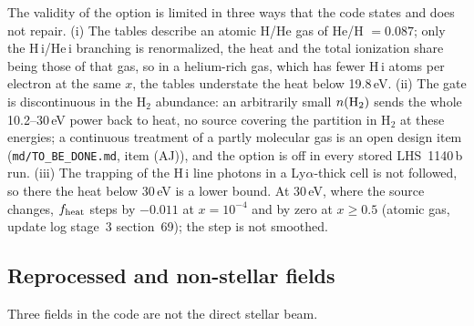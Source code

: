 The validity of the option is limited in three ways that the code states and
does not repair. (i) The tables describe an atomic H/He gas of He/H
$=0.087$; only the H\,{\sc i}/He\,{\sc i} branching is renormalized, the heat
and the total ionization share being those of that gas, so in a
helium-rich gas, which has fewer H\,{\sc i} atoms per electron at the same
$x$, the tables understate the heat below 19.8\,eV. (ii) The gate is
discontinuous in the H$_2$ abundance: an arbitrarily small $n({\rm H_2})$
sends the whole 10.2--30\,eV power back to heat, no source covering the
partition in H$_2$ at these energies; a continuous treatment of a partly
molecular gas is an open design item (\texttt{md/TO\_BE\_DONE.md}, item
(AJ)), and the option is off in every stored LHS~1140\,b run. (iii) The
trapping of the H\,{\sc i} line photons in a Ly$\alpha$-thick cell is not
followed, so there the heat below 30\,eV is a lower bound. At 30\,eV, where
the source changes, $f_{\rm heat}$ steps by $-0.011$ at $x=10^{-4}$ and
by zero at $x\ge0.5$ (atomic gas, update log stage~3 section~69); the step
is not smoothed.

\subsection{Reprocessed and non-stellar fields}
\label{sec:radiation:internal}

Three fields in the code are not the direct stellar beam.

